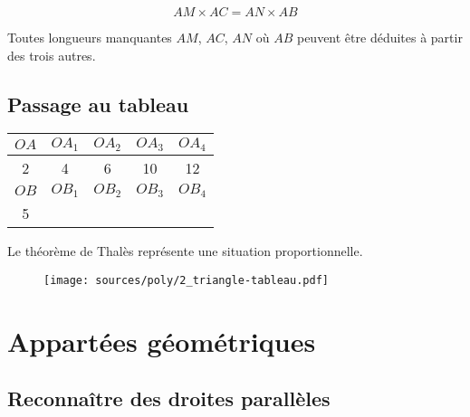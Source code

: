 \documentclass[paper=a4, fontsize=9pt]{scrartcl} %
\begin{document}
$$AM \times AC = AN \times AB$$

Toutes longueurs manquantes $AM$, $AC$, $AN$ où $AB$ peuvent être déduites à partir des trois autres.

\begin{multicols}{2}

\subsection{Passage au tableau}

\begin{center}
  \begin{tabular}{| c || c | c | c | c |}
    \hline
    $OA$    & $OA_1$ & $OA_2$ & $OA_3$ & $OA_4$ \\
    \hline
    2       & 4      & 6      & 10    & 12     \\
    \hline
    \hline
    $OB$    & $OB_1$ & $OB_2$ & $OB_3$ & $OB_4$ \\
    \hline
    5       &        &        &       &        \\
    \hline
  \end{tabular}
\end{center}

\begin{Proposition}{Le théorème de Thalès représente une situation proportionnelle.}
\end{Proposition}

\begin{figure}[H]
  \centering
  \texttt{[image: sources/poly/2\_triangle-tableau.pdf]}
\end{figure}

\end{multicols}


\section{Appartées géométriques}

\subsection{Reconnaître des droites parallèles}
\end{document}
